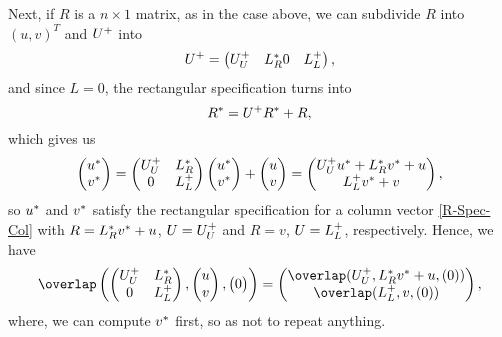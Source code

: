 Next, if $R$ is a $n \times 1$ matrix, as in the case above, we can subdivide $R$ into $(u , v)^T$ and $U^+$ into 
\begin{equation*}
  U^+ = 
  \begin{pmatrix}
    U_U^+ & L_R^*
    0   & L_L^+
  \end{pmatrix},
\end{equation*}
and since $L = 0$, the rectangular specification turns into 
\begin{equation}
\label{R-Spec-Col}
R^* = U^+R^* + R,
\end{equation}
which gives us
\begin{equation*}
  \begin{pmatrix}
    u^* \\
    v^*
  \end{pmatrix}
  = \begin{pmatrix}
    U_U^+ & L_R^* \\
    0        & L_L^+
  \end{pmatrix}
  \begin{pmatrix}
    u^* \\
    v^*
  \end{pmatrix} 
  + 
  \begin{pmatrix}
    u \\
    v
  \end{pmatrix}
  = 
  \begin{pmatrix}
    U_U^+u^* + L_R^*v^* + u \\
    L_L^+v^* + v
  \end{pmatrix},
\end{equation*}
so $u^*$ and $v^*$ satisfy the rectangular specification for a column vector \eqref{R-Spec-Col} with $R = L_R^*v^* + u$, $U = U_U^+$ and $R = v$, $U = L_L^+$, respectively. Hence, we have 
\begin{equation}
\label{overlap3}
\overlap\left(
\begin{pmatrix}
  \tc{U_U} & \rc{L_R} \\
    0      & \tc{L_L}
\end{pmatrix}
, 
\begin{pmatrix}
  u \\ 
  v
\end{pmatrix}
, 
\begin{pmatrix}
0
\end{pmatrix}
\right) = 
\begin{pmatrix}
  \overlap(\tc{U_U} , \rc{L_R}\rc{v} + u , (0) ) \\ 
  \overlap(\tc{L_L} , v, (0) ) 
\end{pmatrix},
\end{equation}
where, we can compute $v^*$ first, so as not to repeat anything.

